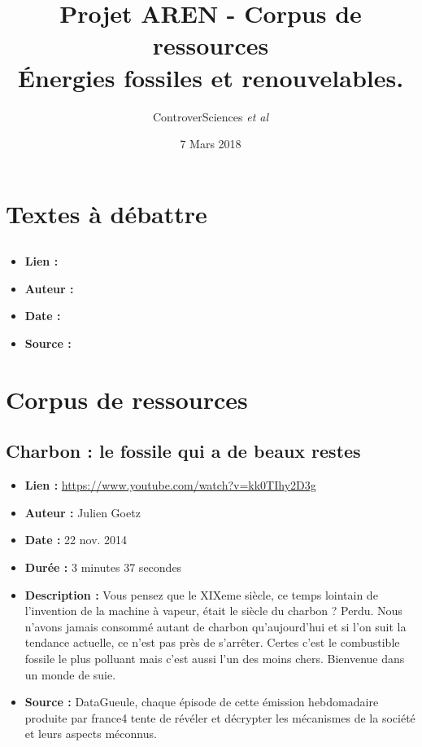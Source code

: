 \documentclass[8pt]{article}
\author{ControverSciences\textit{ et al} }
\title{Projet AREN - Corpus de ressources \\  Énergies fossiles et renouvelables.}
\date{7 Mars 2018}
\begin{document}
\maketitle

\tableofcontents

\newpage
\section{Textes à débattre}
\subsection{}
\begin{itemize}
	\item \textbf{Lien : }  \url{} 
	\item \textbf{Auteur : } 
	\item \textbf{Date : }  
	\item \textbf{Source : }  
\end{itemize}

\newpage

\newpage
\section{Corpus de ressources}

\subsection{Charbon : le fossile qui a de beaux restes}
\begin{itemize}
	\item \textbf{Lien : }  \url{https://www.youtube.com/watch?v=kk0TIhy2D3g} 
	\item \textbf{Auteur : } Julien Goetz
	\item \textbf{Date : } 22 nov. 2014
	\item \textbf{Durée : } 3 minutes 37 secondes
	\item \textbf{Description : } Vous pensez que le XIXeme siècle, ce temps lointain de l'invention de la machine à vapeur, était le siècle du charbon ? Perdu. Nous n'avons jamais consommé autant de charbon qu'aujourd'hui et si l'on suit la tendance actuelle, ce n'est pas près de s'arrêter. Certes c'est le combustible fossile le plus polluant mais c'est aussi l'un des moins chers. Bienvenue dans un monde de suie.
	\item \textbf{Source : } DataGueule, chaque épisode de cette émission hebdomadaire produite par france4 tente de révéler et décrypter les mécanismes de la société et leurs aspects méconnus.
\end{itemize}
\end{document}
